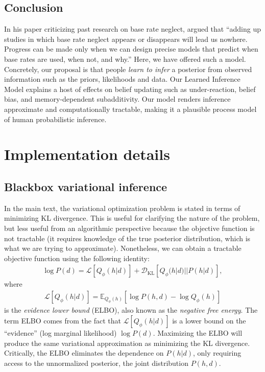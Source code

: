 \subsection{Conclusion}

In his paper criticizing past research on base rate neglect, \cite{gigerenzer1996narrow} argued that ``adding up studies in which base rate neglect appears or disappears will lead us nowhere. Progress can be made only when we can design precise models that predict when base rates are used, when not, and why.'' Here, we have offered such a model. Concretely, our proposal is that people \emph{learn to infer} a posterior from observed information such as the priors, likelihoods and data. Our Learned Inference Model explains a host of effects on belief updating such as under-reaction, belief bias, and memory-dependent subadditivity. Our model renders inference approximate and computationally tractable, making it a plausible process model of human probabilistic inference.


\section{Implementation details}

\subsection{Blackbox variational inference}

In the main text, the variational optimization problem is stated in terms of minimizing KL divergence. This is useful for clarifying the nature of the problem, but less useful from an algorithmic perspective because the objective function is not tractable (it requires knowledge of the true posterior distribution, which is what we are trying to approximate). Nonetheless, we can obtain a tractable objective function using the following identity:
\begin{align}
    \log P(d) = \mathcal{L}[Q_\phi(h|d)] + \mathcal{D}_\text{KL}[Q_\phi(h|d)||P(h|d)],
\end{align}
where
\begin{align}
    \mathcal{L}[Q_\phi(h|d)] = \mathbb{E}_{Q_\phi(h)} \left[ \log P(h,d) - \log Q_\phi(h) \right]
\end{align}
is the \emph{evidence lower bound} (ELBO), also known as the \emph{negative free energy}. The term ELBO comes from the fact that $\mathcal{L}[Q_\phi(h|d)]$ is a lower bound on the ``evidence'' (log marginal likelihood) $\log P(d)$. Maximizing the ELBO will produce the same variational approximation as minimizing the KL divergence. Critically, the ELBO eliminates the dependence on $P(h|d)$, only requiring access to the unnormalized posterior, the joint distribution $P(h,d)$.

